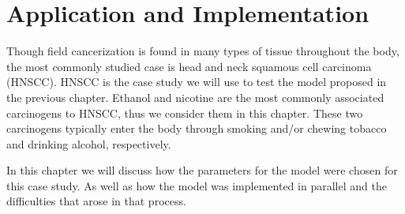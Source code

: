 \documentclass[\main/thesis.tex]{subfiles}
\begin{document}
\chapter{Application and Implementation}

Though field cancerization is found in many types of tissue throughout the body, the most commonly studied case is head and neck squamous cell carcinoma (HNSCC). HNSCC is the case study we will use to test the model proposed in the previous chapter. Ethanol and nicotine are the most commonly associated carcinogens to HNSCC, thus we consider them in this chapter. These two carcinogens typically enter the body through smoking and/or chewing tobacco and drinking alcohol, respectively.

In this chapter we will discuss how the parameters for the model were chosen for this case study. As well as how the model was implemented in parallel and the difficulties that arose in that process.
\end{document}
